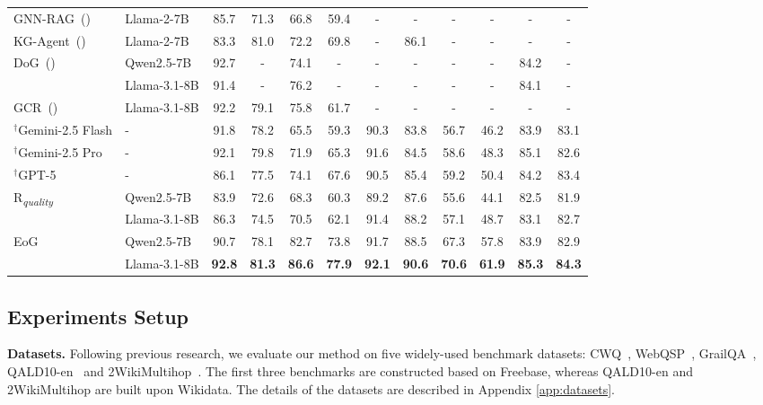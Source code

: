 \begin{table}[t]
{\begin{tabular}{llcccccccccc}
GNN-RAG~(\citeyear{mavromatis2025gnn}) & Llama-2-7B & 85.7 & 71.3 & 66.8 & 59.4 & - & - & - & - & - & - \\
KG-Agent~(\citeyear{jiang-etal-2025-kg}) & Llama-2-7B & 83.3 & 81.0 & 72.2 & 69.8 & - & 86.1 & - & - & - & - \\
\multirow{2}{*}{DoG~(\citeyear{li-etal-2025-decoding-graphs})} & Qwen2.5-7B & 92.7 & - & 74.1 & - & - & - & - & - & 84.2 & - \\
& Llama-3.1-8B & 91.4 & - & 76.2 & - & - & - & - & - & 84.1 & - \\
GCR~(\citeyear{luo2024graph}) 
& Llama-3.1-8B  & 92.2 & 79.1 & 75.8 & 61.7 & - & - & - & - & - & - \\
\midrule
$^\dagger$Gemini-2.5 Flash\label{row:Gemini-2.5 Flash} & - & 91.8 & 78.2 & 65.5 & 59.3 & 90.3 & 83.8 & 56.7 & 46.2 & 83.9 & 83.1  \\
$^\dagger$Gemini-2.5 Pro\label{row:Gemini-2.5 Pro} & - & 92.1 & 79.8 & 71.9 & 65.3 & 91.6 & 84.5 & 58.6 & 48.3 & 85.1 & 82.6 \\
$^\dagger$GPT-5\label{row:GPT5} & - & 86.1 & 77.5 & 74.1 & 67.6 & 90.5 & 85.4 & 59.2 & 50.4 & 84.2 & 83.4  \\
\midrule
\multirow{2}{*}{R\textsubscript{\textit{quality}}} & Qwen2.5-7B  & 83.9 & 72.6 & 68.3 & 60.3 & 89.2 & 87.6 & 55.6 & 44.1 & 82.5 & 81.9 \\
& Llama-3.1-8B & 86.3 & 74.5 & 70.5 & 62.1 & 91.4 & 88.2 & 57.1 & 48.7 & 83.1 & 82.7 \\
\multirow{2}{*}{EoG} & Qwen2.5-7B  & 90.7 & 78.1 & 82.7 & 73.8 & 91.7 & 88.5 & 67.3 & 57.8 & 83.9 & 82.9 \\
& Llama-3.1-8B & \textbf{92.8} & \textbf{81.3} & \textbf{86.6} & \textbf{77.9} & \textbf{92.1} & \textbf{90.6} & \textbf{70.6} & \textbf{61.9} & \textbf{85.3} & \textbf{84.3} \\
\bottomrule
\end{tabular}
}
\end{table}

\subsection{Experiments Setup}
\textbf{Datasets.} Following previous research, we evaluate our method on five widely-used benchmark datasets: CWQ~\citep{talmor-berant-2018-web}, WebQSP~\citep{yih-etal-2016-value}, GrailQA~\citep{Gu_2021}, QALD10-en~\citep{usbeck2024qald} and 2WikiMultihop~\citep{ho2020constructingmultihopqadataset}. The first three benchmarks are constructed based on Freebase, whereas QALD10-en and 2WikiMultihop are built upon Wikidata. The details of the datasets are
described in Appendix \ref{app:datasets}.

